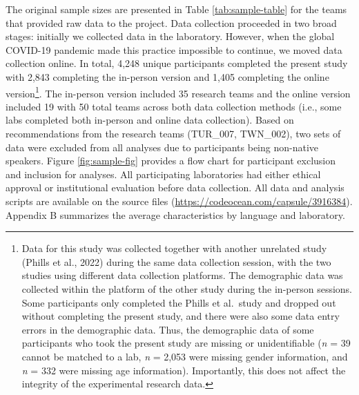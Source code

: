 \documentclass[
  man,floatsintext]{apa7}
\begin{document}
The original sample sizes are presented in Table \ref{tab:sample-table}
for the teams that provided raw data to the project. Data collection
proceeded in two broad stages: initially we collected data in the
laboratory. However, when the global COVID-19 pandemic made this
practice impossible to continue, we moved data collection online. In
total,
4,248
unique participants completed the present study with
2,843
completing the in-person version and
1,405
completing the online version\footnote{Data for this study was collected together with another unrelated
  study (Phills et al., 2022) during the same data collection
  session, with the two studies using different data collection
  platforms. The demographic data was collected within the platform of
  the other study during the in-person sessions. Some participants
  only completed the Phills et al.~study and dropped out without
  completing the present study, and there were also some data entry
  errors in the demographic data. Thus, the demographic data of some
  participants who took the present study are missing or
  unidentifiable (\emph{n} =
  39
  cannot be matched to a lab, \emph{n} =
  2,053
  were missing gender information, and \emph{n} =
  332 were missing age
  information). Importantly, this does not affect the integrity of the
  experimental research data.}. The in-person version included
35
research teams and the online version included
19
with 50 total teams across both data
collection methods (i.e., some labs completed both in-person and online
data collection). Based on recommendations from the research teams
(TUR\_007, TWN\_002), two sets of data were excluded from all analyses due
to participants being non-native speakers. Figure \ref{fig:sample-fig}
provides a flow chart for participant exclusion and inclusion for
analyses. All participating laboratories had either ethical approval or
institutional evaluation before data collection. All data and analysis
scripts are available on the source files
(\url{https://codeocean.com/capsule/3916384}). Appendix B summarizes the
average characteristics by language and laboratory.
\end{document}
